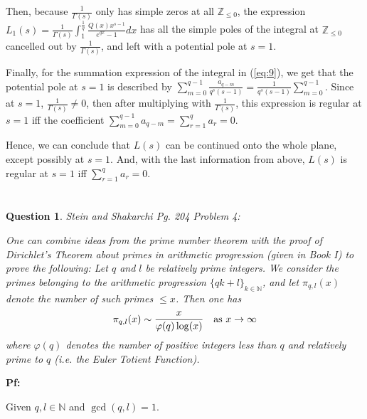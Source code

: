 \documentclass{article}
\newtheorem{question}{Question}
\newcommand{\NN}{\mathbb{N}}
\newcommand{\ZZ}{\mathbb{Z}}
\begin{document}
Then, because $\frac{1}{\Gamma(s)}$ only has simple zeros at all $\ZZ_{\leq 0}$, the expression $L_1(s)= \frac{1}{\Gamma(s)}\int_{1}^{\frac{1}{q}}\frac{Q(x)x^{s-1}}{e^{qx}-1}dx$ has all the simple poles of the integral at $\ZZ_{\leq 0}$ cancelled out by $\frac{1}{\Gamma(s)}$, and left with a potential pole at $s=1$.

\hfil

Finally, for the summation expression of the integral in (\ref{eq:9}), we get that the potential pole at $s=1$ is described by $\sum_{m=0}^{q-1}\frac{a_{q-m}}{q^s(s-1)}=\frac{1}{q^s(s-1)}\sum_{m=0}^{q-1}$. Since at $s=1$, $\frac{1}{\Gamma(s)}\neq 0$, then after multiplying with $\frac{1}{\Gamma(s)}$, this expression is regular at $s=1$ iff the coefficient $\sum_{m=0}^{q-1}a_{q-m}=\sum_{r=1}^{q}a_r = 0$. 

Hence, we can conclude that $L(s)$ can be continued onto the whole plane, except possibly at $s=1$. And, with the last information from above, $L(s)$ is regular at $s=1$ iff $\sum_{r=1}^{q}a_r=0$.

\break

\section{}%
\begin{question}\label{q:2}
    Stein and Shakarchi Pg. 204 Problem 4:

    One can combine ideas from the prime number theorem with the proof of Dirichlet's Theorem about primes in arithmetic progression (given in Book I) to prove the following: Let $q$ and $l$ be relatively prime integers. We consider the primes belonging to the arithmetic progression $\{qk+l\}_{k\in\mathbb{N}}$, and let $\pi_{q,l}(x)$ denote the number of such primes $\leq x$. Then one has 
    $$\pi_{q,l}(x)\sim \frac{x}{\varphi(q)\log(x)}\quad \textmd{as }x\rightarrow\infty$$
    where $\varphi(q)$ denotes the number of positive integers less than $q$ and relatively prime to $q$ (i.e. the Euler Totient Function).
\end{question}

\textbf{Pf:}

Given $q,l\in\NN$ and $\gcd(q,l)=1$.
\end{document}
